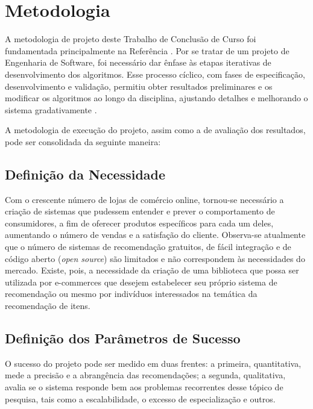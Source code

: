 \chapter[Metodologia]{Metodologia}
\label{chap:metodologia}

A metodologia de projeto deste Trabalho de Conclusão de Curso foi fundamentada principalmente na Referência . Por se tratar de um projeto de Engenharia de Software, foi necessário dar ênfase às etapas iterativas de desenvolvimento dos algoritmos. Esse processo cíclico, com fases de especificação, desenvolvimento e validação, permitiu obter resultados preliminares e os modificar os algoritmos ao longo da disciplina, ajustando detalhes e melhorando o sistema gradativamente \cite{iterative-development}.

A metodologia de execução do projeto, assim como a de avaliação dos resultados, pode ser consolidada da seguinte maneira: 

\section{Definição da Necessidade} %
\label{sec:defini_o_da_necessidade}


Com o crescente número de lojas de comércio online, tornou-se necessário a criação de sistemas que pudessem entender e prever o comportamento de consumidores, a fim de oferecer produtos específicos para cada um deles, aumentando o número de vendas e a satisfação do cliente. Observa-se atualmente que o número de sistemas de recomendação gratuitos, de fácil integração e de código aberto (\textit{open source}) são limitados e não correspondem às necessidades do mercado. Existe, pois, a necessidade da criação de uma biblioteca que possa ser utilizada por e-commerces que desejem estabelecer seu próprio sistema de recomendação ou mesmo por indivíduos interessados na temática da recomendação de itens.

\section{Definição dos Parâmetros de Sucesso} %
\label{sec:defini_o_dos_par_metros_de_sucesso}


O sucesso do projeto pode ser medido em duas frentes: a primeira, quantitativa, mede a precisão e a abrangência das recomendações; a segunda, qualitativa, avalia se o sistema responde bem aos problemas recorrentes desse tópico de pesquisa, tais como a escalabilidade, o excesso de especialização e outros. 

